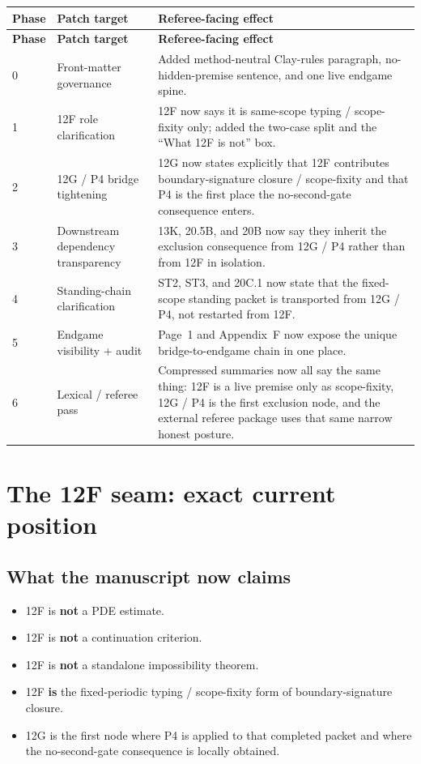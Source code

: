 \documentclass[11pt,letterpaper]{article}
\begin{document}
\begin{longtable}{L{0.75in}L{2.05in}L{3.45in}}
\toprule
\textbf{Phase} & \textbf{Patch target} & \textbf{Referee-facing effect}\\
\midrule
\endfirsthead
\toprule
\textbf{Phase} & \textbf{Patch target} & \textbf{Referee-facing effect}\\
\midrule
{} & Front-matter governance & Added method-neutral Clay-rules paragraph, no-hidden-premise sentence, and one live endgame spine.\\
1 & 12F role clarification & 12F now says it is same-scope typing / scope-fixity only; added the two-case split and the ``What 12F is not'' box.\\
2 & 12G / P4 bridge tightening & 12G now states explicitly that 12F contributes boundary-signature closure / scope-fixity and that P4 is the first place the no-second-gate consequence enters.\\
3 & Downstream dependency transparency & 13K, 20.5B, and 20B now say they inherit the exclusion consequence from 12G / P4 rather than from 12F in isolation.\\
4 & Standing-chain clarification & ST2, ST3, and 20C.1 now state that the fixed-scope standing packet is transported from 12G / P4, not restarted from 12F.\\
5 & Endgame visibility + audit & Page~1 and Appendix~F now expose the unique bridge-to-endgame chain in one place.\\
6 & Lexical / referee pass & Compressed summaries now all say the same thing: 12F is a live premise only as scope-fixity, 12G / P4 is the first exclusion node, and the external referee package uses that same narrow honest posture.\\
\bottomrule
\end{longtable}

\section{The 12F seam: exact current position}

\subsection{What the manuscript now claims}

\begin{itemize}
\item 12F is \textbf{not} a PDE estimate.
\item 12F is \textbf{not} a continuation criterion.
\item 12F is \textbf{not} a standalone impossibility theorem.
\item 12F \textbf{is} the fixed-periodic typing / scope-fixity form of boundary-signature closure.
\item 12G is the first node where P4 is applied to that completed packet and where the no-second-gate consequence is locally obtained.
\end{itemize}
\end{document}
